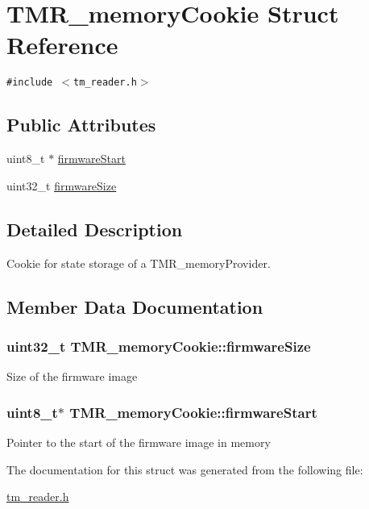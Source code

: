 \hypertarget{struct_t_m_r__memory_cookie}{
\section{TMR\_\-memoryCookie Struct Reference}
\label{struct_t_m_r__memory_cookie}
}
{\tt \#include $<$tm\_\-reader.h$>$}

\subsection*{Public Attributes}
\begin{CompactItemize}
\item 
uint8\_\-t $\ast$ \hyperlink{struct_t_m_r__memory_cookie_df6a45e48bedbbf03d91dbac6ce5a7c5}{firmwareStart}
\item 
uint32\_\-t \hyperlink{struct_t_m_r__memory_cookie_97e2a8b4c85e3595d6f55e5d6881e82a}{firmwareSize}
\end{CompactItemize}


\subsection{Detailed Description}
Cookie for state storage of a TMR\_\-memoryProvider. 

\subsection{Member Data Documentation}
\hypertarget{struct_t_m_r__memory_cookie_97e2a8b4c85e3595d6f55e5d6881e82a}{
\subsubsection[{firmwareSize}]{\setlength{\rightskip}{0pt plus 5cm}uint32\_\-t {\bf TMR\_\-memoryCookie::firmwareSize}}}
\label{struct_t_m_r__memory_cookie_97e2a8b4c85e3595d6f55e5d6881e82a}


Size of the firmware image \hypertarget{struct_t_m_r__memory_cookie_df6a45e48bedbbf03d91dbac6ce5a7c5}{
\subsubsection[{firmwareStart}]{\setlength{\rightskip}{0pt plus 5cm}uint8\_\-t$\ast$ {\bf TMR\_\-memoryCookie::firmwareStart}}}
\label{struct_t_m_r__memory_cookie_df6a45e48bedbbf03d91dbac6ce5a7c5}


Pointer to the start of the firmware image in memory 

The documentation for this struct was generated from the following file:\begin{CompactItemize}
\item 
\hyperlink{tm__reader_8h}{tm\_\-reader.h}\end{CompactItemize}
